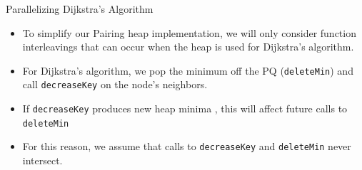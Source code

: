 \documentclass{beamer}
\begin{document}


\begin{frame}{Parallelizing Dijkstra's Algorithm}
  \begin{itemize}
  \item To simplify our Pairing heap implementation, we will only
    consider function interleavings that can occur when the heap is used
    for Dijkstra's algorithm.
  \item For Dijkstra's algorithm, we pop the minimum off the PQ (\texttt{deleteMin})
    and call \texttt{decreaseKey} on the node's neighbors.
  \item If \texttt{decreaseKey} produces new heap minima , this will affect
    future calls to \texttt{deleteMin}
  \item For this reason, we assume that calls to \texttt{decreaseKey} and \texttt{deleteMin}
    never intersect.
  \end{itemize}
\end{frame}
\end{document}
